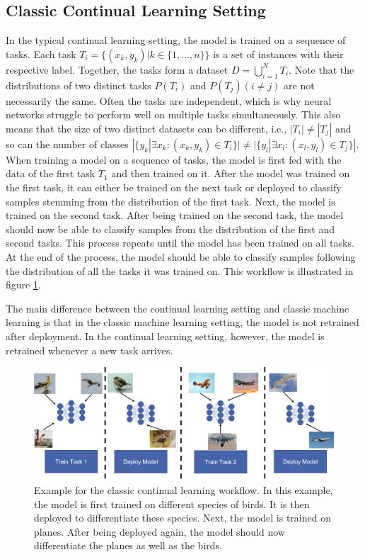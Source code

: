 \subsection{Classic Continual Learning Setting}
\label{sec:Methodology:CLSetting}
In the typical continual learning setting, the model is trained on a sequence of tasks. Each task $T_i = \{(x_k,y_k) | k \in \{1,\ldots,n\}\}$ is a set
of instances with their respective label. Together, the tasks form a dataset $D = \bigcup\limits_{i=1}^{N} T_i$. Note that
the distributions of two distinct tasks $P(T_i)$  and $P(T_j) (i \neq j)$ are not necessarily the same. Often the tasks are independent, which is why
neural networks struggle to perform well on multiple tasks simultaneously. This also means that the size of two distinct datasets
can be different, i.e., $|T_i| \neq |T_j|$ and so can the number of classes $|\{y_k | \exists x_k: (x_k,y_k) \in T_i \}| \neq |\{y_l | \exists x_l: (x_l,y_l)
\in T_j\}|$. When training a model on a sequence of tasks, the model is first fed with the data of the first task $T_1$ and then trained on it. 
After the model was trained on the first task, it can either be trained on the next task or deployed to classify samples stemming from the
distribution of the first task. Next, the model is trained on the second task. After being trained on the second task, the model should now be able to
classify samples from the distribution of the first and second tasks. This process repeats until the model has been trained on all
tasks. At the end of the process, the model should be able to classify samples following the distribution of all the tasks it was trained on.
This workflow is illustrated in figure \ref{fig:CLWorkflow}. \par
The main difference between the continual learning setting and classic machine learning is that in the classic machine learning setting, the model is
not retrained after deployment. In the continual learning setting, however, the model is retrained whenever a new task arrives.

\begin{figure}[ht]
    \centering
    \includegraphics[width=.9\linewidth]{images/CL_workflow.png}
    \caption[Continual learning workflow]{Example for the classic continual learning workflow. In this example, the model is first trained on different species of
    birds. It is then deployed to differentiate these species. Next, the model is trained on planes. After being deployed again, the model should now differentiate
    the planes as well as the birds.}
    \label{fig:CLWorkflow}
  \end{figure}

